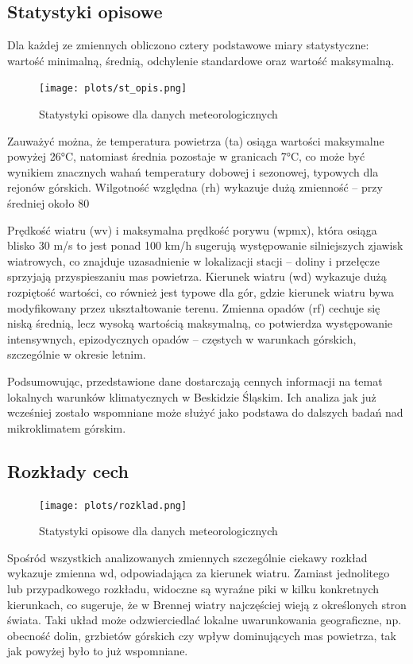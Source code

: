 \documentclass[10pt,a4paper]{article}
\begin{document}
\subsection*{Statystyki opisowe}
Dla każdej ze zmiennych obliczono cztery podstawowe miary statystyczne: wartość minimalną, średnią, odchylenie standardowe oraz wartość maksymalną.
\begin{figure}[H]
	\centering
	\texttt{[image: plots/st\_opis.png]}
	\caption{Statystyki opisowe dla danych meteorologicznych}
	\label{fig:my_label}
\end{figure}
Zauważyć można, że temperatura powietrza (ta) osiąga wartości maksymalne powyżej 26°C, natomiast średnia pozostaje w granicach 7°C, co może być wynikiem znacznych wahań temperatury dobowej i sezonowej, typowych dla rejonów górskich. Wilgotność względna (rh) wykazuje dużą zmienność – przy średniej około 80%
\par
\hspace{0.75cm}
Prędkość wiatru (wv) i maksymalna prędkość porywu (wpmx), która osiąga blisko 30 m/s to jest ponad 100 km/h sugerują występowanie silniejszych zjawisk wiatrowych, co znajduje uzasadnienie w lokalizacji stacji – doliny i przełęcze sprzyjają przyspieszaniu mas powietrza. Kierunek wiatru (wd) wykazuje dużą rozpiętość wartości, co również jest typowe dla gór, gdzie kierunek wiatru bywa modyfikowany przez ukształtowanie terenu. Zmienna opadów (rf) cechuje się niską średnią, lecz wysoką wartością maksymalną, co potwierdza występowanie intensywnych, epizodycznych opadów – częstych w warunkach górskich, szczególnie w okresie letnim.
\par
\hspace{0.75cm}
Podsumowując, przedstawione dane dostarczają cennych informacji na temat lokalnych warunków klimatycznych w Beskidzie Śląskim. Ich analiza jak już wcześniej zostało wspomniane może służyć jako podstawa do dalszych badań nad mikroklimatem górskim.

\subsection*{Rozkłady cech}
\begin{figure}[H]
	\centering
	\texttt{[image: plots/rozklad.png]}
	\caption{Statystyki opisowe dla danych meteorologicznych}
	\label{fig:my_label}
\end{figure}
Spośród wszystkich analizowanych zmiennych szczególnie ciekawy rozkład wykazuje zmienna wd, odpowiadająca za kierunek wiatru. Zamiast jednolitego lub przypadkowego rozkładu, widoczne są wyraźne piki w kilku konkretnych kierunkach, co sugeruje, że w Brennej wiatry najczęściej wieją z określonych stron świata. Taki układ może odzwierciedlać lokalne uwarunkowania geograficzne, np. obecność dolin, grzbietów górskich czy wpływ dominujących mas powietrza, tak jak powyżej było to już wspomniane.
\end{document}

